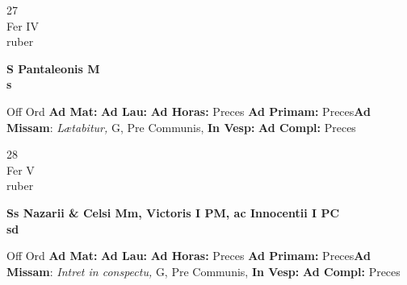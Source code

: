 \documentclass[10pt, openany]{book}
\begin{document}
    \begin{center}
        \begin{minipage}{3.5in}
            \vspace{2em}
            \begin{minipage}{0.5in}
                {\Huge 27} \\
                {\normalsize Fer IV} \\
                {\normalsize ruber}
            \end{minipage}
            \begin{minipage}{3.0in}
                \textbf{ \large S Pantaleonis M \\
                \textnormal{\normalsize s}} \\ 
            \end{minipage}
            \begin{justify}Off Ord
                \textbf{Ad Mat: }
                \textbf{Ad Lau: }
                \textbf{Ad Horas: }Preces
                \textbf{Ad Primam: }Preces\textbf{Ad Missam}: \textit{Lætabitur,} G, Pre Communis,  
                \textbf{In Vesp: }
                \textbf{Ad Compl: }Preces
            \end{justify}
        \end{minipage}
    \end{center}

    \begin{center}
        \begin{minipage}{3.5in}
            \vspace{2em}
            \begin{minipage}{0.5in}
                {\Huge 28} \\
                {\normalsize Fer V} \\
                {\normalsize ruber}
            \end{minipage}
            \begin{minipage}{3.0in}
                \textbf{ \large Ss Nazarii \& Celsi Mm, Victoris I PM, ac Innocentii I PC \\
                \textnormal{\normalsize sd}} \\ 
            \end{minipage}
            \begin{justify}Off Ord
                \textbf{Ad Mat: }
                \textbf{Ad Lau: }
                \textbf{Ad Horas: }Preces
                \textbf{Ad Primam: }Preces\textbf{Ad Missam}: \textit{Intret in conspectu,} G, Pre Communis,  
                \textbf{In Vesp: }
                \textbf{Ad Compl: }Preces
            \end{justify}
        \end{minipage}
    \end{center}
\end{document}
